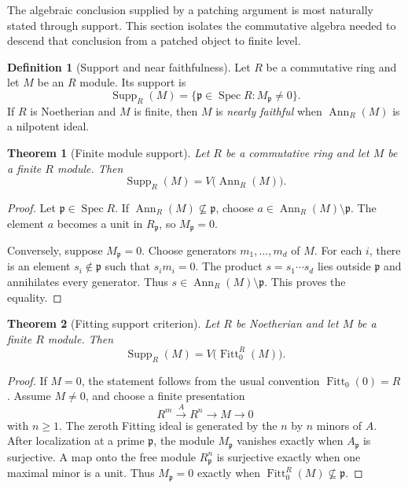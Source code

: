 \documentclass{aomart}
\newtheorem{theorem}{Theorem}[section]
\theoremstyle{definition}
\newtheorem{definition}[definition]{Definition}
\theoremstyle{remark}
\newcommand{\Spec}{\operatorname{Spec}}
\newcommand{\Supp}{\operatorname{Supp}}
\newcommand{\Ann}{\operatorname{Ann}}
\newcommand{\Fitt}{\operatorname{Fitt}}
\newcommand{\frakp}{\mathfrak p}
\begin{document}
The algebraic conclusion supplied by a patching argument is most naturally stated through support. This section isolates the commutative algebra needed to descend that conclusion from a patched object to finite level.

\begin{definition}[Support and near faithfulness]\label{def:support_near_faithful}
Let \(R\) be a commutative ring and let \(M\) be an \(R\) module. Its support is
\[
\Supp_R(M)
=
\{\frakp\in\Spec R:M_{\frakp}\neq0\}.
\]
If \(R\) is Noetherian and \(M\) is finite, then \(M\) is \emph{nearly faithful} when \(\Ann_R(M)\) is a nilpotent ideal.
\end{definition}

\begin{theorem}[Finite module support]\label{thm:finite_module_support}
Let \(R\) be a commutative ring and let \(M\) be a finite \(R\) module. Then
\[
\boxed{
\Supp_R(M)
=
V\bigl(\Ann_R(M)\bigr).
}
\]
\end{theorem}

\begin{proof}
Let \(\frakp\in\Spec R\). If \(\Ann_R(M)\not\subseteq\frakp\), choose
\(a\in\Ann_R(M)\setminus\frakp\). The element \(a\) becomes a unit in
\(R_{\frakp}\), so \(M_{\frakp}=0\).

Conversely, suppose \(M_{\frakp}=0\). Choose generators
\(m_1,\ldots,m_d\) of \(M\). For each \(i\), there is an element
\(s_i\notin\frakp\) such that \(s_im_i=0\). The product
\(s=s_1\cdots s_d\) lies outside \(\frakp\) and annihilates every generator.
Thus \(s\in\Ann_R(M)\setminus\frakp\). This proves the equality.
\end{proof}

\begin{theorem}[Fitting support criterion]\label{thm:fitting_support}
Let \(R\) be Noetherian and let \(M\) be a finite \(R\) module. Then
\[
\boxed{
\Supp_R(M)
=
V\bigl(\Fitt_0^R(M)\bigr).
}
\]
\end{theorem}

\begin{proof}
If \(M=0\), the statement follows from the usual convention \(\Fitt_0(0)=R\). Assume \(M\neq0\), and choose a finite presentation
\[
R^m\xrightarrow{A}R^n\longrightarrow M\longrightarrow0
\]
with \(n\geq1\).
The zeroth Fitting ideal is generated by the \(n\) by \(n\) minors of \(A\). After localization at a prime \(\frakp\), the module \(M_{\frakp}\) vanishes exactly when \(A_{\frakp}\) is surjective. A map onto the free module \(R_{\frakp}^n\) is surjective exactly when one maximal minor is a unit. Thus \(M_{\frakp}=0\) exactly when \(\Fitt_0^R(M)\not\subseteq\frakp\).
\end{proof}
\end{document}
